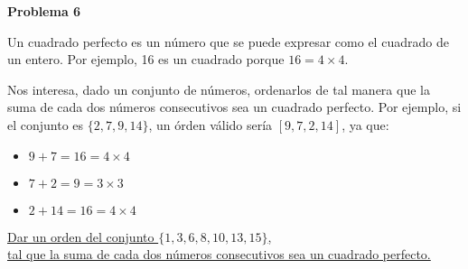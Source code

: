 \begin{center}
\Large \textbf{Problema 6}
\end{center}

Un cuadrado perfecto es un número que se puede expresar como el cuadrado de un entero. Por ejemplo, 16 es un cuadrado porque $16 = 4 \times 4$.

\bigskip
Nos interesa, dado un conjunto de números, ordenarlos de tal manera que la suma de cada dos números consecutivos sea un cuadrado perfecto.
Por ejemplo, si el conjunto es $\{2, 7, 9, 14\}$, un órden válido sería $[9, 7, 2, 14]$, ya que:
\begin{itemize}
    \item $9 + 7 = 16 = 4 \times 4$
    \item $7 + 2 = 9 = 3 \times 3$
    \item $2 + 14 = 16 = 4 \times 4$
\end{itemize}

\underline{Dar un orden del conjunto $\{1, 3, 6, 8, 10, 13, 15\}$,} \\
\underline{tal que la suma de cada dos números consecutivos sea un cuadrado perfecto.}

